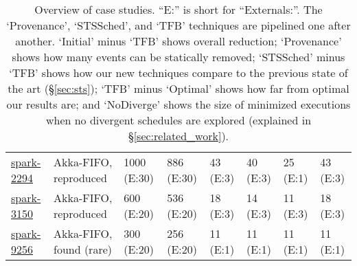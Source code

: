 \begin{table*}
{\begin{tabular}{|l|l|l|l|l|l||l||l|}
\href{https://docs.google.com/document/d/1JQiaLlm6XwLCWKOBOFkaMzg8Gd7NT5gDH3_8OV-oekY}{spark-2294}
& Akka-FIFO, reproduced
& 1000 \hfill (E:30) & 886 \hfill (E:30) & 43 \hfill (E:3) & 40 \hfill (E:3) &
25 \hfill (E:1) & 43 \hfill (E:3) \\


\href{https://docs.google.com/document/d/1mWbxS2-B0v4fbY_FIASs6HCmAXFh6K89DMYX-XEmeL8}{spark-3150}
& Akka-FIFO, reproduced
& 600 \hfill (E:20) & 536 \hfill (E:20) & 18 \hfill (E:3) & 14 \hfill (E:3) &
11 \hfill (E:3) & 18 \hfill (E:3) \\

\href{https://docs.google.com/document/d/1rPseAbo3FELT8Fj2lrRUMkrDmjLPYI26Jgr8goAMLzU}{spark-9256}
& Akka-FIFO, found (rare)
& 300 \hfill (E:20) & 256 \hfill (E:20) & 11 \hfill (E:1) & 11 \hfill (E:1) &
11 \hfill (E:1) & 11 \hfill (E:1) \\

\hline
\end{tabular}
\caption{Overview of case studies. ``E:'' is short for ``Externals:''. The
`Provenance', `STSSched', and `TFB' techniques are pipelined one after another.
`Initial' minus `TFB' shows overall reduction; `Provenance' shows how many events can be statically
removed; `STSSched' minus `TFB' shows how our new techniques
compare to the previous state of the art (\S\ref{sec:sts});
 `TFB' minus `Optimal' shows how far from optimal our results are; and
`NoDiverge' shows the size of minimized executions when no divergent schedules are explored (explained
in \S\ref{sec:related_work}).}
\label{dtab:case_studies}
}
\end{table*}


